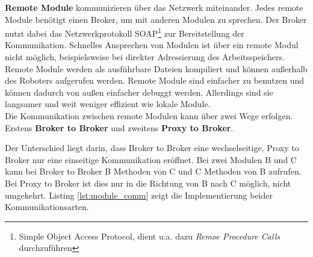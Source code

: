 \textbf{Remote Module} kommunizieren über das Netzwerk miteinander. Jedes remote Module benötigt einen Broker, um mit anderen Modulen zu sprechen. Der Broker nutzt dabei das Netzwerkprotokoll SOAP\footnote{Simple Object Access Protocol, dient u.a. dazu \textit{Remoe Procedure Calls} durchzuführen} zur Bereitstellung der Kommunikation. Schnelles Ansprechen von Modulen ist über ein remote Modul nicht möglich, beispielsweise bei direkter Adressierung des Arbeitsspeichers. Remote Module werden als ausführbare Dateien kompiliert und können außerhalb des Roboters aufgerufen werden. Remote Module sind einfacher zu benutzen und können dadurch von außen einfacher debuggt werden. Allerdings sind sie langsamer und weit weniger effizient wie lokale Module. 
\\
Die Kommunikation zwischen remote Modulen kann über zwei Wege erfolgen. Erstens \textbf{Broker to Broker} und zweitens \textbf{Proxy to Broker}.
 
Der Unterschied liegt darin, dass Broker to Broker eine wechselseitige, Proxy to Broker nur eine einseitige Kommunikation eröffnet. Bei zwei Modulen B und C kann bei Broker to Broker B Methoden von C und C Methoden von B aufrufen. Bei Proxy to Broker ist dies nur in die Richtung von B nach C möglich, nicht umgekehrt. Listing \ref{lst:module_comm} zeigt die Implementierung beider Kommunikationsarten.

